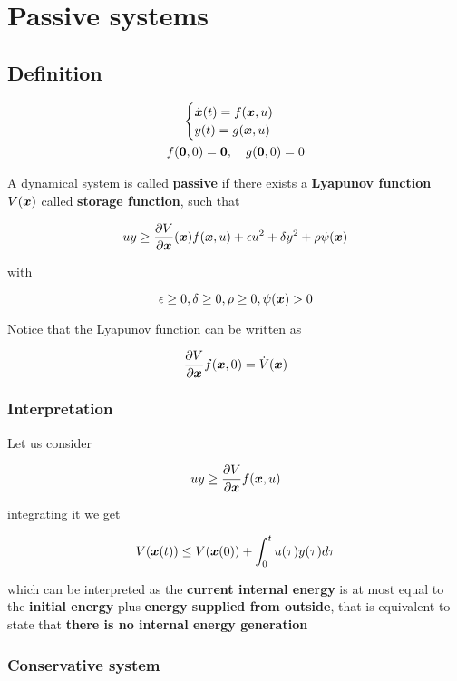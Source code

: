 \chapter{Passive systems}

\section{Definition}

\begin{gather*}
    \begin{cases}
        \dot{\boldsymbol{x}} (t) = f(\boldsymbol{x},u) \\
        y(t) = g(\boldsymbol{x},u)
    \end{cases} \\
    f(\boldsymbol{0},0) = \boldsymbol{0}, \quad g(\boldsymbol{0},0)=0
\end{gather*}

A dynamical system is called \textbf{passive} if there exists a \textbf{Lyapunov function} $V(\boldsymbol{x})$ called \textbf{storage function}, such that

\[
    uy \geq \frac{\partial V}{\partial \boldsymbol{x}}(\boldsymbol{x}) f(\boldsymbol{x},u) + \epsilon u^2 + \delta y^2 + \rho \psi(\boldsymbol{x})
\]

with

\[
    \epsilon \geq 0, \delta \geq 0, \rho \geq 0, \psi(\boldsymbol{x}) > 0
\]

Notice that the Lyapunov function can be written as

\[
     \frac{\partial V}{\partial \boldsymbol{x}} f(\boldsymbol{x},0) = \dot{V}(\boldsymbol{x})
\]

\subsection{Interpretation}

Let us consider

\[
    uy \geq \frac{\partial V}{\partial \boldsymbol{x}} f(\boldsymbol{x},u)
\]

integrating it we get

\[
    V(\boldsymbol{x}(t)) \leq V(\boldsymbol{x}(0)) + \int_0^t u(\tau)y(\tau) d\tau
\]

which can be interpreted as the \textbf{current internal energy} is at most equal to the \textbf{initial energy} plus
\textbf{energy supplied from outside}, that is equivalent to state that \textbf{there is no internal energy generation}




\subsection{Conservative system}


